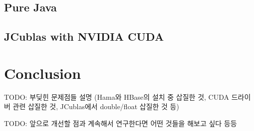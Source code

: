 \documentclass[a4paper]{article}
\begin{document}
\begin{multicols}{2}
\subsection{Pure Java}
\subsection{JCublas with NVIDIA CUDA}

\section{Conclusion}
TODO: 부딪힌 문제점들 설명 (Hama와 HBase의 설치 중 삽질한 것, CUDA 드라이버 관련 삽질한 것, JCublas에서 double/float 삽질한 것 등)

TODO: 앞으로 개선할 점과 계속해서 연구한다면 어떤 것들을 해보고 싶다 등등

\end{multicols}
\end{document}
